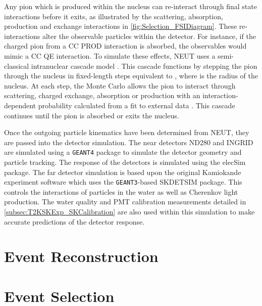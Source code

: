 Any pion which is produced within the nucleus can re-interact through final state interactions before it exits, as illustrated by the scattering, absorption, production and exchange interactions in \autoref{fig:Selection_FSIDiagram}. These re-interactions alter the observable particles within the detector. For instance, if the charged pion from a CC PROD interaction is absorbed, the observables would mimic a CC QE interaction. To simulate these effects, NEUT uses a semi-classical intranuclear cascade model \cite{Hayato2021}. This cascade functions by stepping the pion through the nucleus in fixed-length steps equivalent to , where  is the radius of the nucleus. At each step, the Monte Carlo allows the pion to interact through scattering, charged exchange, absorption or production with an interaction-dependent probability calculated from a fit to external data \cite{PhysRevD.99.052007}. This cascade continues until the pion is absorbed or exits the nucleus.

Once the outgoing particle kinematics have been determined from NEUT, they are passed into the detector simulation. The near detectors ND280 and INGRID are simulated using a \texttt{GEANT4} package \cite{t2k_det,geant4} to simulate the detector geometry and particle tracking. The response of the detectors is simulated using the elecSim package. The far detector simulation is based upon the original Kamiokande experiment software which uses the \texttt{GEANT3}-based SKDETSIM \cite{Brun:1987ma,t2k_det} package. This controls the interactions of particles in the water as well as Cherenkov light production. The water quality and PMT calibration measurements detailed in \autoref{subsec:T2KSKExp_SKCalibration} are also used within this simulation to make accurate predictions of the detector response.

\section{Event Reconstruction}
\label{sec:Simulation_Reconstruction}

\section{Event Selection}
\label{sec:Selections_Selection}
